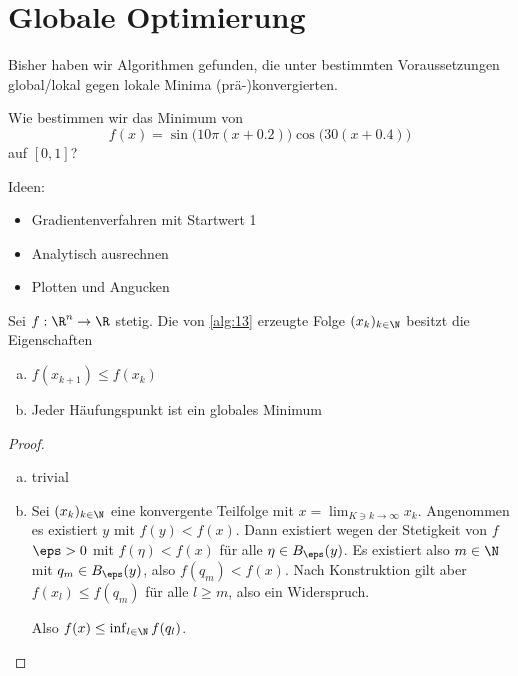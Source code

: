 \chapter{Globale Optimierung}



Bisher haben wir Algorithmen gefunden, die unter bestimmten Voraussetzungen global/lokal gegen lokale Minima (prä-)konvergierten.

Wie bestimmen wir das Minimum von
\[
	f(x) = \sin\big( 10 \pi (x + 0.2) \big) \cos \big(30 (x + 0.4)\big)
\]
auf $[0, 1]$?

Ideen:
\begin{itemize}
	\item
		Gradientenverfahren mit Startwert 1
	\item
		Analytisch ausrechnen
	\item
		Plotten und Angucken
\end{itemize}

\begin{alg} \label{alg:13}
	\begin{algorithmic}
			\Else
			\EndIf
		\EndFor
	\end{algorithmic}
\end{alg}

\begin{lem} \label{4.1}
	Sei $f: \R^n \to \R$ stetig.
	Die von \ref{alg:13} erzeugte Folge $(x_k)_{k\in\N}$ besitzt die Eigenschaften
	\begin{enumerate}[(a)]
		\item
			$f(x_{k+1}) \le f(x_k)$
		\item
			Jeder Häufungspunkt ist ein globales Minimum
	\end{enumerate}
	\begin{proof}
		\begin{enumerate}[(a)]
			\item
				trivial
			\item
				Sei $(x_k)_{k\in\N}$ eine konvergente Teilfolge mit $x = \lim_{K \ni k \to \infty} x_k$.
				Angenommen es existiert $y$ mit $f(y) < f(x)$.
				Dann existiert wegen der Stetigkeit von $f$ $\eps > 0$ mit $f(\eta) < f(x)$ für alle $\eta \in B_\eps(y)$.
				Es existiert also $m \in \N$ mit $q_m \in B_\eps(y)$, also $f(q_m) < f(x)$.
				Nach Konstruktion gilt aber $f(x_l) \le f(q_m)$ für alle $l \ge m$, also ein Widerspruch.

				Also $f(x) \le \inf_{l \in \N} f(q_l)$.
		\end{enumerate}
	\end{proof}
\end{lem}


